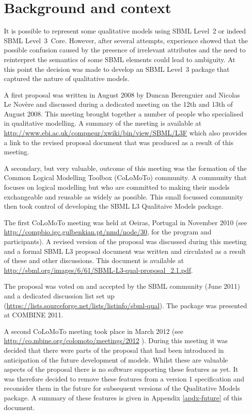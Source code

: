 
\section{Background and context}
\label{background}

It is possible to represent some qualitative models using SBML Level~2 or indeed SBML Level~3~Core. However,  after several attempts, experience showed that the possible confusion caused by the presence of irrelevant attributes and the need to reinterpret the semantics of some SBML elements could lead to ambiguity. At this point the decision was made to develop an SBML Level~3 package that captured the nature of qualitative models.


A first proposal was written in August 2008 by Duncan Berenguier and Nicolas Le Nov\`ere and discussed during a dedicated meeting on the 12th and 13th of August 2008. This meeting brought together a number of people who specialised in qualitative modelling. A summary of the meeting is available at \url{http://www.ebi.ac.uk/compneur/xwiki/bin/view/SBML/L3F} which also provides a link to the revised proposal document that was produced as a result of this meeting.

A secondary, but very valuable, outcome of this meeting was the formation of the Common Logical Modelling Toolbox (CoLoMoTo) community. A community that focuses on logical modelling but who are committed to making their models exchangeable and reusable as widely as possible.  This small focussed community then took control of developing the SBML L3 Qualitaive Models package.

The first CoLoMoTo meeting was held at Oeiras, Portugal in November 2010 (see \url{http://compbio.igc.gulbenkian.pt/nmd/node/30}, for the program and participants). A revised version of the proposal was discussed during this meeting and a formal SBML L3 proposal document was written and circulated as a result of these and other discussions.
This document is available at \url{http://sbml.org/images/6/61/SBML-L3-qual-proposal_2.1.pdf}.

The proposal was voted on and accepted by the SBML community (June 2011) and a dedicated discussion list set up (\url{https://lists.sourceforge.net/lists/listinfo/sbml-qual}). The package was presented at COMBINE 2011.

A second CoLoMoTo meeting took place in March 2012 (see \url{http://co.mbine.org/colomoto/meetings/2012} ). During this meeting it was decided that there were parts of the proposal that had been introduced in anticipation of the future development of models. Whilst these are valuable aspects of the proposal there is no software supporting these features as yet. It was therefore decided to remove these features from a version 1 specification and reconsider them in the future for subsequent versions of the Qualitative Models package. A summary of these features is given in Appendix \ref{apdx-future} of this document.



